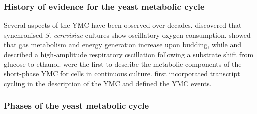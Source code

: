 \subsubsection{History of evidence for the yeast metabolic cycle}
\label{subsubsec:intro-ymc-definition-history}

Several aspects of the YMC have been observed over decades.
\citet{nosohSYNCHRONIZATIONBUDDINGCYCLE1962} discovered that synchronised \emph{S. cerevisiae} cultures show oscillatory oxygen consumption.
\citet{kasparvonmeyenburgEnergeticsBuddingCycle1969} showed that gas metabolism and energy generation increase upon budding, while and \citet{mochanRespiratoryOscillationsAdapting1973} described a high-amplitude respiratory oscillation following a substrate shift from glucose to ethanol.
\citet{satroutdinovOscillatoryMetabolismSaccharomyces1992} were the first to describe the metabolic components of the short-phase YMC for cells in continuous culture.
\citet{tuLogicYeastMetabolic2005} first incorporated transcript cycling in the description of the YMC and defined the YMC events.

\subsubsection{Phases of the yeast metabolic cycle}
\label{subsubsec:intro-ymc-definition-phases}

